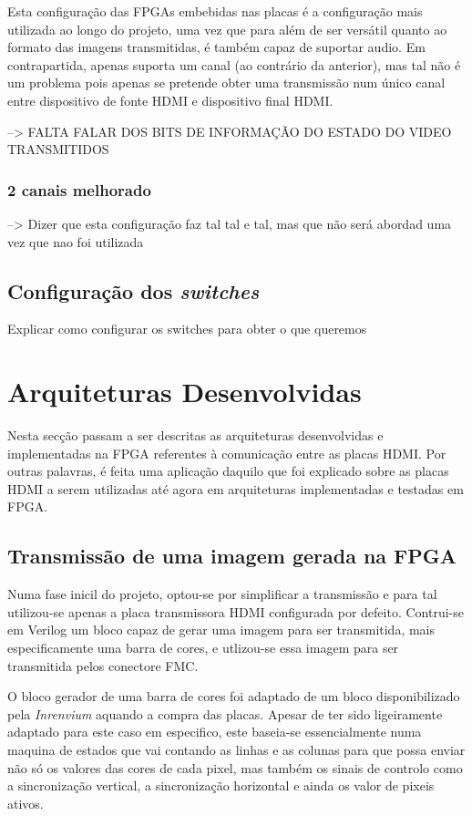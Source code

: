 Esta configuração das FPGAs embebidas nas placas é a configuração mais utilizada ao longo do projeto, uma vez que para além de ser versátil quanto ao formato das imagens transmitidas, é também capaz de suportar audio. Em contrapartida, apenas suporta um canal (ao contrário da anterior), mas tal não é um problema pois apenas se pretende obter uma transmissão num único canal entre dispositivo de fonte HDMI e dispositivo final HDMI. 


--> FALTA FALAR DOS BITS DE INFORMAÇÃO DO ESTADO DO VIDEO TRANSMITIDOS
\subsubsection{2 canais melhorado} \label{subsubsec:HDMIconfigMelhorado}

--> Dizer que esta configuração faz tal tal e tal, mas que não será abordad uma vez que nao foi utilizada

\subsection{Configuração dos \textit{switches}}

Explicar como configurar os switches para obter o que queremos

\section{Arquiteturas Desenvolvidas} \label{sec:HDMIarquiteturas}

Nesta secção passam a ser descritas as arquiteturas desenvolvidas e implementadas na FPGA referentes à comunicação entre as placas HDMI.  Por outras palavras, é feita uma aplicação daquilo que foi explicado sobre as placas HDMI a serem utilizadas até agora em arquiteturas implementadas e testadas em FPGA.

\subsection{Transmissão de uma imagem gerada na FPGA} \label{subsub:planA}

Numa fase inicil do projeto, optou-se por simplificar a transmissão e para tal utilizou-se apenas a placa transmissora HDMI configurada por defeito. Contrui-se em Verilog um bloco capaz de gerar uma imagem para ser transmitida, mais especificamente uma barra de cores, e utlizou-se essa imagem para ser transmitida pelos conectore FMC.

O bloco gerador de uma barra de cores foi adaptado de um bloco disponibilizado pela \textit{Inrenvium} aquando a compra das placas. Apesar de ter sido ligeiramente adaptado para este caso em especifico, este baseia-se essencialmente numa maquina de estados que vai contando as linhas e as colunas para que possa enviar não só os valores das cores de cada pixel, mas também os sinais de controlo como a sincronização vertical, a sincronização horizontal e ainda os valor de pixeis ativos.

